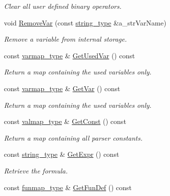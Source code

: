 \begin{DoxyCompactItemize}
\begin{DoxyCompactList}\small\item\em Clear all user defined binary operators. \end{DoxyCompactList}\item 
void \hyperlink{classmu_1_1_parser_base_a8e5a54620200dfbd42ec084c29249d94}{Remove\+Var} (const \hyperlink{namespacemu_ae9f8b44d9a97dd397180891e8390c3e9}{string\+\_\+type} \&a\+\_\+str\+Var\+Name)
\begin{DoxyCompactList}\small\item\em Remove a variable from internal storage. \end{DoxyCompactList}\item 
const \hyperlink{namespacemu_ab57755354e948a664ad94d38546dbb10}{varmap\+\_\+type} \& \hyperlink{classmu_1_1_parser_base_a42cd9be355fea027e5c11acaf1c40767}{Get\+Used\+Var} () const 
\begin{DoxyCompactList}\small\item\em Return a map containing the used variables only. \end{DoxyCompactList}\item 
const \hyperlink{namespacemu_ab57755354e948a664ad94d38546dbb10}{varmap\+\_\+type} \& \hyperlink{classmu_1_1_parser_base_aaad6f7b4889b843111f18510f4f5253b}{Get\+Var} () const 
\begin{DoxyCompactList}\small\item\em Return a map containing the used variables only. \end{DoxyCompactList}\item 
const \hyperlink{namespacemu_a5940d281286a01342cf773f74481843c}{valmap\+\_\+type} \& \hyperlink{classmu_1_1_parser_base_a0175999f0834125322a615f0b2926be6}{Get\+Const} () const 
\begin{DoxyCompactList}\small\item\em Return a map containing all parser constants. \end{DoxyCompactList}\item 
const \hyperlink{namespacemu_ae9f8b44d9a97dd397180891e8390c3e9}{string\+\_\+type} \& \hyperlink{classmu_1_1_parser_base_ac7fda9e26aaf03d06d5342a10e03d18c}{Get\+Expr} () const 
\begin{DoxyCompactList}\small\item\em Retrieve the formula. \end{DoxyCompactList}\item 
const \hyperlink{namespacemu_aa38fb627ca71e44a49de0f2fe4d9031d}{funmap\+\_\+type} \& \hyperlink{classmu_1_1_parser_base_a326eaefb5a2c9c14aa8d34213690a22f}{Get\+Fun\+Def} () const 

\end{DoxyCompactItemize}
